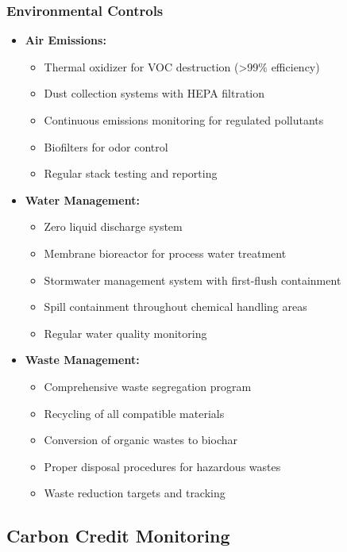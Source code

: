 \subsubsection{Environmental Controls}
\begin{itemize}
    \item \textbf{Air Emissions:}
    \begin{itemize}
        \item Thermal oxidizer for VOC destruction (>99\% efficiency)
        \item Dust collection systems with HEPA filtration
        \item Continuous emissions monitoring for regulated pollutants
        \item Biofilters for odor control
        \item Regular stack testing and reporting
    \end{itemize}
    
    \item \textbf{Water Management:}
    \begin{itemize}
        \item Zero liquid discharge system
        \item Membrane bioreactor for process water treatment
        \item Stormwater management system with first-flush containment
        \item Spill containment throughout chemical handling areas
        \item Regular water quality monitoring
    \end{itemize}
    
    \item \textbf{Waste Management:}
    \begin{itemize}
        \item Comprehensive waste segregation program
        \item Recycling of all compatible materials
        \item Conversion of organic wastes to biochar
        \item Proper disposal procedures for hazardous wastes
        \item Waste reduction targets and tracking
    \end{itemize}
\end{itemize}

\subsection{Carbon Credit Monitoring}

